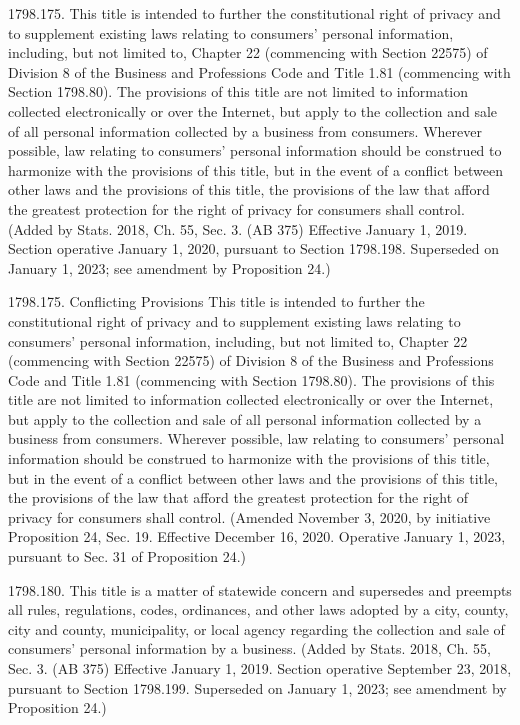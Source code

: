 1798.175.  This title is intended to further the constitutional right of privacy and to supplement existing laws relating to consumers’ personal information, including, but not limited to, Chapter 22 (commencing with Section 22575) of Division 8 of the Business and Professions Code and Title 1.81 (commencing with Section 1798.80). The provisions of this title are not limited to information collected electronically or over the Internet, but apply to the collection and sale of all personal information collected by a business from consumers. Wherever possible, law relating to consumers’ personal information should be construed to harmonize with the provisions of this title, but in the event of a conflict between other laws and the provisions of this title, the provisions of the law that afford the greatest protection for the right of privacy for consumers shall control.
(Added by Stats. 2018, Ch. 55, Sec. 3. (AB 375) Effective January 1, 2019. Section operative January 1, 2020, pursuant to Section 1798.198. Superseded on January 1, 2023; see amendment by Proposition 24.)

1798.175.  Conflicting Provisions
This title is intended to further the constitutional right of privacy and to supplement existing laws relating to consumers’ personal information, including, but not limited to, Chapter 22 (commencing with Section 22575) of Division 8 of the Business and Professions Code and Title 1.81 (commencing with Section 1798.80). The provisions of this title are not limited to information collected electronically or over the Internet, but apply to the collection and sale of all personal information collected by a business from consumers. Wherever possible, law relating to consumers’ personal information should be construed to harmonize with the provisions of this title, but in the event of a conflict between other laws and the provisions of this title, the provisions of the law that afford the greatest protection for the right of privacy for consumers shall control.
(Amended November 3, 2020, by initiative Proposition 24, Sec. 19. Effective December 16, 2020. Operative January 1, 2023, pursuant to Sec. 31 of Proposition 24.)

1798.180.  This title is a matter of statewide concern and supersedes and preempts all rules, regulations, codes, ordinances, and other laws adopted by a city, county, city and county, municipality, or local agency regarding the collection and sale of consumers’ personal information by a business.
(Added by Stats. 2018, Ch. 55, Sec. 3. (AB 375) Effective January 1, 2019. Section operative September 23, 2018, pursuant to Section 1798.199. Superseded on January 1, 2023; see amendment by Proposition 24.)

